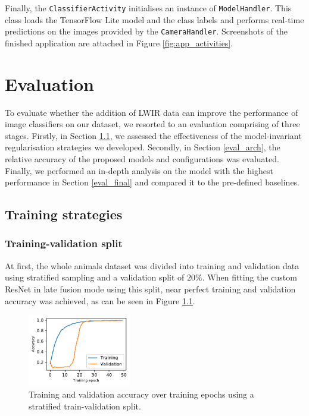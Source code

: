 \documentclass{l4proj}
\begin{document}
Finally, the \lstinline{ClassifierActivity} initialises an instance of \lstinline{ModelHandler}. This class loads the TensorFlow Lite model and the class labels and performs real-time predictions on the images provided by the \lstinline{CameraHandler}. Screenshots of the finished application are attached in Figure \ref{fig:app_activities}.




\chapter{Evaluation}
\label{evaluation}

To evaluate whether the addition of LWIR data can improve the performance of image classifiers on our dataset, we resorted to an evaluation comprising of three stages. Firstly, in Section \ref{eval_strategies}, we assessed the effectiveness of the model-invariant regularisation strategies we developed. Secondly, in Section \ref{eval_arch}, the relative accuracy of the proposed models and configurations was evaluated. Finally, we performed an in-depth analysis on the model with the highest performance in Section \ref{eval_final} and compared it to the pre-defined baselines.

\section{Training strategies}
\label{eval_strategies}

\subsection{Training-validation split}
\label{eval_train_val_split}

At first, the whole animals dataset was divided into training and validation data using stratified sampling and a validation split of $20\%$. When fitting the custom ResNet in late fusion mode using this split, near perfect training and validation accuracy was achieved, as can be seen in Figure \ref{fig:acc_stratified}.  

\begin{figure}[ht]
  \centering
    \includegraphics[width=0.4\textwidth]{images/evaluation/stratified/accuracy}
  \caption{Training and validation accuracy over training epochs using a stratified train-validation split.}
  \label{fig:acc_stratified}
\end{figure}
\end{document}
